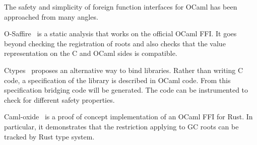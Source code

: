 \documentclass[a4paper]{easychair}
\newcommand{\cpp}[1]{\lstinline[style=C++]{#1}}
\begin{document}
The safety and simplicity of foreign function interfaces for OCaml has been
approached from many angles.

O-Saffire~\citep{Furr:2005:CTS:1064978.1065019} is a static analysis that works
on the official OCaml FFI. It goes beyond checking the registration of roots
and also checks that the value representation on the C and OCaml sides is
compatible.

Ctypes~\citep{DBLP:journals/scp/YallopSM18} proposes an alternative way to bind
libraries. Rather than writing C code, a specification of the library is
described in OCaml code. From this specification bridging code will be
generated. The code can be instrumented to check for different safety
properties.

Caml-oxide~\citep{camloxide} is a proof of concept implementation of an OCaml
FFI for Rust. In particular, it demonstrates that the restriction applying to
GC roots can be tracked by Rust type system.

% 
% 

\label{sect:bib}

\end{document}
